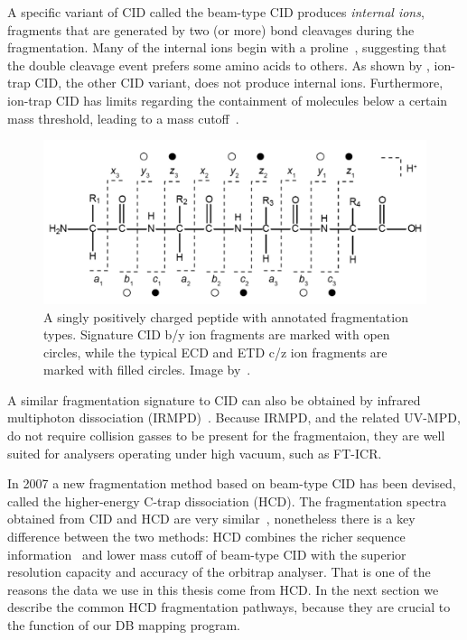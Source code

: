 A specific variant of CID called the beam-type CID produces \emph{internal ions}, fragments that are generated by two (or more) bond cleavages during the fragmentation. Many of the internal ions begin with a proline~\cite{michalski2012systematic}, suggesting that the double cleavage event prefers some amino acids to others. As shown by \citet{michalski2012systematic}, ion-trap CID, the other CID variant, does not produce internal ions. Furthermore, ion-trap CID has limits regarding the containment of molecules below a certain mass threshold, leading to a mass cutoff~\cite{louris1987instrumentation}.

\begin{figure}
  \centering
  \includegraphics[width=.75\linewidth]{img/fragment-types.png}
  \caption{A singly positively charged peptide with annotated fragmentation types. Signature CID b/y ion fragments are marked with open circles, while the typical ECD and ETD c/z ion fragments are marked with filled circles. Image by~\citet{hart2014review}.}\label{fig:fragment-types}
\end{figure}

A similar fragmentation signature to CID can also be obtained by infrared multiphoton dissociation (IRMPD)~\cite{oomens2006gas}. Because IRMPD, and the related UV-MPD, do not require collision gasses to be present for the fragmentaion, they are well suited for analysers operating under high vacuum, such as FT-ICR\@.

In 2007 a new fragmentation method based on beam-type CID has been devised, called the higher-energy C-trap dissociation (HCD)\@. The fragmentation spectra obtained from CID and HCD are very similar~\cite{michalski2012systematic}, nonetheless there is a key difference between the two methods: HCD combines the richer sequence information~\cite{xia2006ion} and lower mass cutoff of beam-type CID with the superior resolution capacity and accuracy of the orbitrap analyser. That is one of the reasons the data we use in this thesis come from HCD\@. In the next section we describe the common HCD fragmentation pathways, because they are crucial to the function of our DB mapping program.


